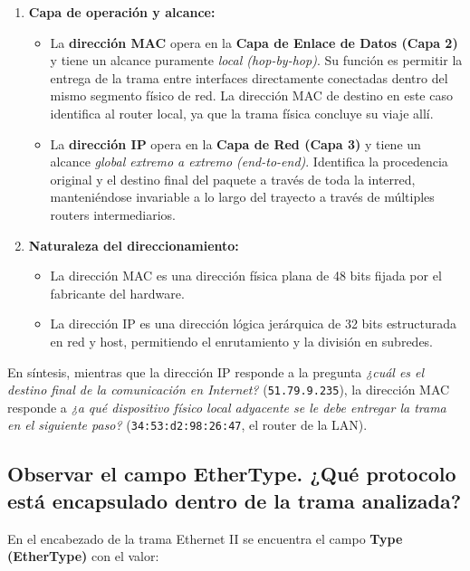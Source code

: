 \documentclass[12pt,a4paper]{article}
\begin{document}
\begin{enumerate}
    \item \textbf{Capa de operación y alcance:}
    \begin{itemize}
        \item La \textbf{dirección MAC} opera en la \textbf{Capa de Enlace de Datos (Capa 2)} y tiene un alcance puramente \textit{local (hop-by-hop)}. Su función es permitir la entrega de la trama entre interfaces directamente conectadas dentro del mismo segmento físico de red. La dirección MAC de destino en este caso identifica al router local, ya que la trama física concluye su viaje allí.
        \item La \textbf{dirección IP} opera en la \textbf{Capa de Red (Capa 3)} y tiene un alcance \textit{global extremo a extremo (end-to-end)}. Identifica la procedencia original y el destino final del paquete a través de toda la interred, manteniéndose invariable a lo largo del trayecto a través de múltiples routers intermediarios.
    \end{itemize}
    
    \item \textbf{Naturaleza del direccionamiento:}
    \begin{itemize}
        \item La dirección MAC es una dirección física plana de 48 bits fijada por el fabricante del hardware.
        \item La dirección IP es una dirección lógica jerárquica de 32 bits estructurada en red y host, permitiendo el enrutamiento y la división en subredes.
    \end{itemize}
\end{enumerate}

En síntesis, mientras que la dirección IP responde a la pregunta \textit{¿cuál es el destino final de la comunicación en Internet?} (\texttt{51.79.9.235}), la dirección MAC responde a \textit{¿a qué dispositivo físico local adyacente se le debe entregar la trama en el siguiente paso?} (\texttt{34:53:d2:98:26:47}, el router de la LAN).

\subsection{Observar el campo EtherType. ¿Qué protocolo está encapsulado dentro de la trama analizada?}

En el encabezado de la trama Ethernet II se encuentra el campo \textbf{Type (EtherType)} con el valor:
\end{document}
